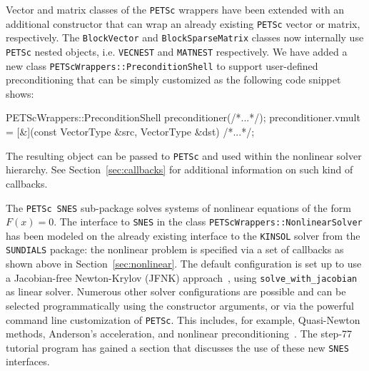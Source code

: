 \documentclass{ansarticle-preprint}
\newcommand{\specialword}[1]{\texttt{#1}}
\newcommand{\petsc}{\specialword{PETSc}\xspace}
\newcommand{\snes}{{\specialword{SNES}}\xspace}
\newcommand{\sundials}{{\specialword{SUNDIALS}}\xspace}
\newcommand{\kinsol}{{\specialword{KINSOL}}\xspace}
\begin{document}
Vector and matrix classes of the \petsc wrappers have been extended with an additional constructor
that can wrap an already existing \petsc vector or matrix, respectively.
The \texttt{BlockVector} and
\texttt{BlockSparseMatrix} classes now internally use
\petsc nested objects, i.e. \texttt{VECNEST} and  \texttt{MATNEST} respectively.
We have added a new class \texttt{PETScWrappers::PreconditionShell} to support user-defined
preconditioning that can be simply customized as the following code
snippet shows:
\begin{c++}
PETScWrappers::PreconditionShell preconditioner(/*...*/);
preconditioner.vmult = [&](const VectorType &src,
                           VectorType       &dst) {/*...*/};

\end{c++}
The resulting object can be passed to \petsc and used within the nonlinear solver hierarchy.
See Section~\ref{sec:callbacks} for additional information on such kind of callbacks.

The \petsc~\snes sub-package solves systems of nonlinear equations of the form $F(x) = 0$.
The interface to \snes in the class \texttt{PETScWrappers::NonlinearSolver} has been modeled on the already existing interface
to the \kinsol solver from the \sundials package: the nonlinear problem
is specified via a set of callbacks as shown above in Section~\ref{sec:nonlinear}.
%
The default configuration is set up to use a Jacobian-free Newton-Krylov (JFNK)
approach~\cite{knoll2004jacobian}, using \texttt{solve\_with\_jacobian} as linear solver.
Numerous other solver configurations are possible and can be selected
programmatically using the constructor arguments,
or via the powerful command line customization of \petsc.
This includes, for example, Quasi-Newton methods, Anderson's acceleration, and
nonlinear preconditioning~\cite{brune2015composing}. The step-77
tutorial program has gained a section that discusses the use of these
new \snes interfaces.
\end{document}
